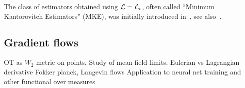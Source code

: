 The class of estimators obtained using $\mathcal{L}=\mathcal{L}_c$, often called ``Minimum Kantorovitch Estimators'' (MKE), was initially introduced in~\cite{bassetti2006minimum}, see also~\cite{CanasRosasco}.



\subsection{Gradient flows}

OT as $W_2$ metric on points. 
Study of mean field limits.
   Eulerian vs Lagrangian derivative 
   Fokker planck, Langevin flows
   Application to neural net training and other functional over measures
